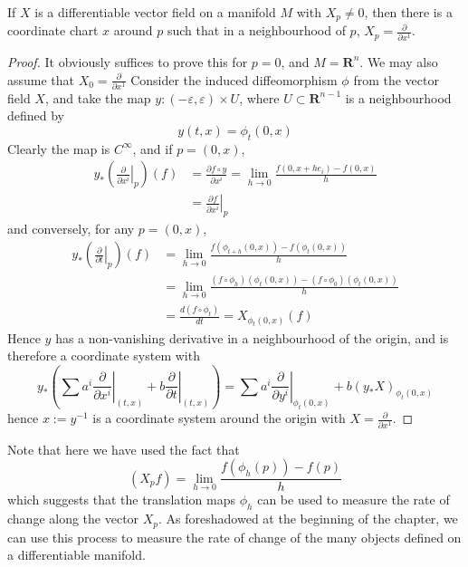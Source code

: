 \begin{theorem}
    If $X$ is a differentiable vector field on a manifold $M$ with $X_p \neq 0$, then there is a coordinate chart $x$ around $p$ such that in a neighbourhood of $p$, $X_p = \frac{\partial}{\partial x^1}$.
\end{theorem}
\begin{proof}
    It obviously suffices to prove this for $p = 0$, and $M = \mathbf{R}^n$. We may also assume that $X_0 = \frac{\partial}{\partial x^1}$ Consider the induced diffeomorphism $\phi$ from the vector field $X$, and take the map $y: (-\varepsilon, \varepsilon) \times U$, where $U \subset \mathbf{R}^{n-1}$ is a neighbourhood defined by
    \[ y(t,x) = \phi_t(0,x) \]
    Clearly the map is $C^\infty$, and if $p = (0,x)$,
    \begin{align*}
        y_* \left( \left. \frac{\partial}{\partial x^i} \right|_p \right)(f) &= \frac{\partial f \circ y}{\partial x^i} = \lim_{h \to 0} \frac{f(0,x + he_i) - f(0,x)}{h}\\
        &= \left. \frac{\partial f}{\partial x^i} \right|_p
    \end{align*}
    and conversely, for any $p = (0,x)$,
    \begin{align*}
        y_* \left( \left. \frac{\partial}{\partial t} \right|_p \right) (f) &= \lim_{h \to 0} \frac{f(\phi_{t + h}(0,x)) - f(\phi_t(0,x))}{h}\\
        &= \lim_{h \to 0} \frac{(f \circ \phi_h)(\phi_t(0,x)) - (f \circ \phi_0)(\phi_t(0,x))}{h}\\
        &= \frac{d (f \circ \phi_t)}{dt} = X_{\phi_t(0,x)}(f)
    \end{align*}
    Hence $y$ has a non-vanishing derivative in a neighbourhood of the origin, and is therefore a coordinate system with
    \[ y_* \left( \sum a^i \left. \frac{\partial}{\partial x^i} \right|_{(t,x)} + b \left. \frac{\partial}{\partial t} \right|_{(t,x)} \right) = \sum a^i \left. \frac{\partial}{\partial y^i} \right|_{\phi_t(0,x)} + b (y_*X)_{\phi_t(0,x)}  \]
    hence $x := y^{-1}$ is a coordinate system around the origin with $X = \frac{\partial}{\partial x^1}$.
\end{proof}

Note that here we have used the fact that
%
\[ (X_p f) = \lim_{h \to 0} \frac{f(\phi_h(p)) - f(p)}{h} \]
%
which suggests that the translation maps $\phi_h$ can be used to measure the rate of change along the vector $X_p$. As foreshadowed at the beginning of the chapter, we can use this process to measure the rate of change of the many objects defined on a differentiable manifold.

